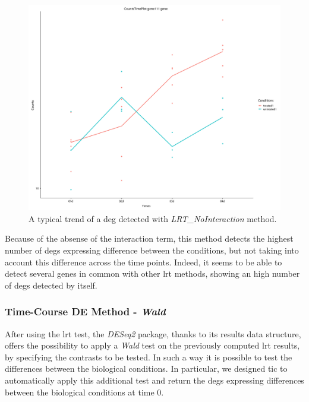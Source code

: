 \begin{figure}[H]
\centering
\includegraphics[width=\textwidth, keepaspectratio]{img/ticorser/de/trends/trend_noint.pdf}
\caption[\gls{tic} LRT\_NOInteraction trend]{A typical trend of a \gls{deg} detected with \textit{LRT\_NoInteraction} method.}
\label{fig:ticlrtnoint}
\end{figure}

Because of the absense of the interaction term, this method detects the highest number of \glspl{deg} expressing difference between the conditions, but not taking into account this difference across the time points.
Indeed, it seems to be able to detect several genes in common with other \gls{lrt} methods, showing an high number of \glspl{deg} detected by itself.

\subsubsection{Time-Course DE Method - \textit{Wald}}

After using the \gls{lrt} test, the \textit{DESeq2} package, thanks to its results data structure, offers the possibility to apply a \textit{Wald} test on the previously computed \gls{lrt} results, by specifying the contrasts to be tested.
In such a way it is possible to test the differences between the biological conditions.
In particular, we designed \gls{tic} to automatically apply this additional test and return the \glspl{deg} expressing differences between the biological conditions at time 0.

